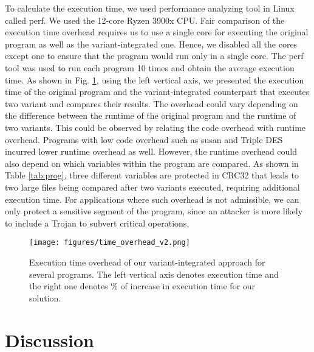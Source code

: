 \documentclass[conference]{IEEEtran}
\begin{document}
To calculate the execution time, we used performance analyzing tool in Linux called perf. We used the 12-core Ryzen 3900x CPU. Fair comparison of the execution time overhead requires us to use a single core for executing the original program as well as the variant-integrated one. Hence, we disabled all the cores except one to ensure that the program would run only in a single core. The perf tool was used to run each program 10 times and obtain the average execution time. As shown in Fig. \ref{fig:run_overhead}, using the left vertical axis, we presented the execution time of the original program and the variant-integrated counterpart that executes two variant and compares their results. The overhead could vary depending on  the difference between the runtime of the original program and the runtime of two variants. This could be observed by relating the code overhead with runtime overhead. Programs with low code overhead such as susan and Triple DES incurred lower runtime overhead as well. However, the runtime overhead could also depend on which variables within the program are compared. As shown in Table  \ref{tab:prog}, three different variables are protected in CRC32 that leads to two large files being compared after two variants executed, requiring additional execution time. For applications where such overhead is not admissible, we can only protect a sensitive segment of the program, since an attacker is more likely to include a Trojan to subvert critical operations. 
 





\begin{figure}[t!]
\centerline{\texttt{[image: figures/time\_overhead\_v2.png]}}
\caption{Execution time overhead of our variant-integrated approach for several programs. The left vertical axis denotes execution time and the right one denotes \% of increase in execution time for our solution.   }
\label{fig:run_overhead}
\end{figure}

\section{Discussion}
\label{sec:disc}
\end{document}
